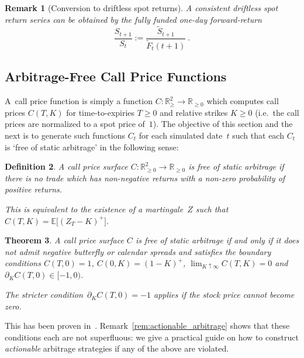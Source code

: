 \documentclass[11pt,a4paper]{article}
\newtheorem{definition}{Definition}[section]
\newtheorem{theorem}[definition]{Theorem}
\newtheorem{remark}[definition]{Remark}
\newcommand{\R}{\mathbb{R}}
\newcommand{\E}{\mathbb{E}}
\DeclareRobustCommand{\eqlabel}[1]{\label{eq:#1}}                                     %
\DeclareRobustCommand{\eq}[1]{\begin{equation}\eqlabel{#1}}                           %
\DeclareRobustCommand{\eqend}{\end{equation}}                                         %
\begin{document}
\begin{remark}[Conversion to driftless spot returns]\label{rem:driftlessspot}
  A consistent driftless spot return series can be obtained by the fully funded one-day forward-return
  \eq{driftlessspotret}
    \frac{ S_{t+1} }{ S_t } := \frac{\tilde S_{t+1}}{\tilde F_t(t+1)}  \ .
  \eqend
\end{remark}

\subsection{Arbitrage-Free Call Price Functions}

A~call price function is simply a function $C:\R^2_{\geq} \longrightarrow  \R_{\geq 0}$
which computes call prices $C(T,K)$ for time-to-expiries $T\geq 0$ and relative
strikes $K\geq 0$ (i.e.~the call prices are normalized to a spot price of~$1$). 
The objective of this section and the next is to generate such functions $C_t$ for each
simulated date~$t$ such that each $C_t$ is `free of static arbitrage' in the following sense:

\begin{definition}
A call price surface $C: \R^2_{\geq 0}\to \R_{\geq 0}$ is \emph{free of static arbitrage} if there is no trade
which has non-negative returns with a non-zero probability of
positive returns.    

This is equivalent to the existence of a
martingale~$Z$ such that $C(T,K)= \E\big[(Z_{T}-K)^+\big]$.
\end{definition}

\begin{theorem}\label{th:arbfree}
A call price surface $C$ is free of static arbitrage if and only if 
it does not admit negative butterfly or calendar
spreads and satisfies the boundary conditions
$C(T,0)=1$, $C(0,K)=(1-K)^+$, $\lim_{K\uparrow\infty} C(T,K)=0$ and $\partial_K C(T,0)\in[-1,0)$.

The stricter condition~$\partial_K C(T,0)=-1$ applies if the stock price cannot become zero.
\end{theorem}

This has been proven in~\citet{buehler2006expensive}. Remark~\ref{rem:actionable_arbitrage}
shows that these conditions each are not superfluous: we give a practical
guide on how to construct \emph{actionable} arbitrage strategies if any of the above
are violated. 
\end{document}

